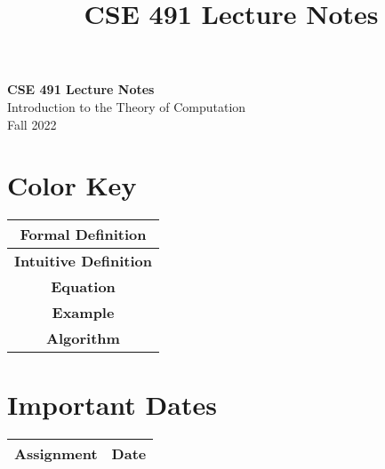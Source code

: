 \documentclass[11pt]{lectures}
\begin{document}
\setcounter{section}{8}
\title{CSE 491 Lecture Notes}

\thispagestyle{empty}

\begin{center}
{\LARGE \bf CSE 491 Lecture Notes}\\
{\large Introduction to the Theory of Computation}\\
Fall 2022
\end{center}
\begin{multicols}{2}
\section*{Color Key}
\begin{tabular}{|c|}
    \hline
     \colorbox{defn}{\textbf{Formal Definition}}\\
     \hline
     \colorbox{intu}{\textbf{Intuitive Definition}}\\
     \hline
     \colorbox{eqn}{\textbf{Equation}}\\
     \hline
     \colorbox{exam}{\textbf{Example}}\\
     \hline
     \colorbox{algo}{\textbf{Algorithm}}\\
     \hline
\end{tabular}

\section*{Important Dates}
\begin{tabular}{|c|c|}
    \hline
    \textbf{Assignment} & \textbf{Date} \\
    \hline
    \hline
\end{tabular}
\end{multicols}
\setcounter{section}{0}
\end{document}
